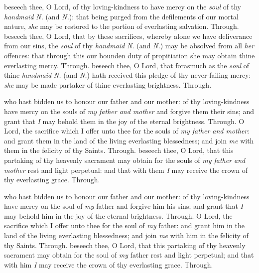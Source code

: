 \begin{multicols}{2}
 beseech thee, O Lord, of thy loving-kindness to have mercy on the \textit{soul} of thy \textit{handmaid} \textit{N.} (and \textit{N.}): that being purged from the defilements of our mortal nature, \textit{she} may be restored to the portion of everlasting salvation. Through.
 beseech thee, O Lord, that by these sacrifices, whereby alone we have deliverance from our sins, the \textit{soul} of thy \textit{handmaid} \textit{N.} (and \textit{N.}) may be absolved from all \textit{her} offences: that through this our bounden duty of propitiation she may obtain thine everlasting mercy. Through.
 beseech thee, O Lord, that forasmuch as the \textit{soul} of thine \textit{handmaid} \textit{N.} (and \textit{N.}) hath received this pledge of thy never-failing mercy: \textit{she} may be made partaker of thine everlasting brightness. Through.

 who hast bidden us to honour our father and our mother: of thy loving-kindness have mercy on the souls of \textit{my father and mother} and forgive them their sins; and grant that \textit{I} may behold them in the joy of the eternal brightness. Through.
 O Lord, the sacrifice which I offer unto thee for the souls of \textit{my father and mother}: and grant them in the land of the living everlasting blessedness; and join \textit{me} with them in the felicity of thy Saints. Through.
 beseech thee, O Lord, that this partaking of thy heavenly sacrament may obtain for the souls of \textit{my father and mother} rest and light perpetual: and that with them \textit{I} may receive the crown of thy everlasting grace. Through.

 who hast bidden us to honour our father and our mother: of thy loving-kindness have mercy on the soul of \textit{my} father and forgive him his sins; and grant that \textit{I} may behold him in the joy of the eternal brightness. Through.
 O Lord, the sacrifice which I offer unto thee for the soul of \textit{my} father: and grant him in the land of the living everlasting blessedness; and join \textit{me} with him in the felicity of thy Saints. Through.
 beseech thee, O Lord, that this partaking of thy heavenly sacrament may obtain for the soul of \textit{my} father rest and light perpetual; and that with him \textit{I} may receive the crown of thy everlasting grace. Through.


\end{multicols}

